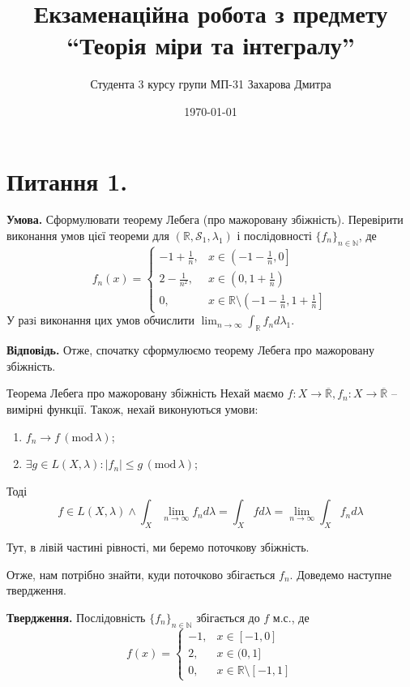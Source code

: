 \documentclass[14pt]{extarticle}
\title{Екзаменаційна робота з предмету ``Теорія міри та інтегралу''}
\author{Студента 3 курсу групи МП-31 Захарова Дмитра}
\date{\today}
\begin{document}
\maketitle

\section*{Питання 1.}

\textbf{Умова.} Сформулювати теорему Лебега (про мажоровану збіжність). Перевірити виконання умов цієї теореми для $(\mathbb{R},\mathcal{S}_1,\lambda_1)$ і послідовності $\{f_n\}_{n \in \mathbb{N}}$, де
\[
f_n(x) = \begin{cases}
    -1 + \frac{1}{n}, & x \in \left(-1-\frac{1}{n},0\right] \\
    2 - \frac{1}{n^2}, & x \in \left(0,1+\frac{1}{n}\right) \\
    0, & x \in \mathbb{R} \setminus \left(-1-\frac{1}{n},1+\frac{1}{n}\right]
\end{cases}
\]
У разi виконання цих умов обчислити $\lim_{n \to \infty}\int_{\mathbb{R}}f_nd\lambda_1$.

\textbf{Відповідь.} Отже, спочатку сформулюємо теорему Лебега про мажоровану збіжність.

\begin{theorem*}{Теорема Лебега про мажоровану збіжність}
Нехай маємо $f: X \to \overline{\mathbb{R}}, f_n: X \to \overline{\mathbb{R}}$ -- вимірні функції. Також, нехай виконуються умови:
\begin{enumerate}
    \item $f_n \to f \, (\text{mod} \, \lambda)$;
    \item $\exists g \in L(X,\lambda): |f_n| \leq g \, (\text{mod} \, \lambda)$;
\end{enumerate}
Тоді
\[
f \in L(X,\lambda) \wedge \int_X \lim_{n \to \infty}f_nd\lambda = \int_X fd\lambda = \lim_{n \to \infty}\int_X f_nd\lambda
\]

Тут, в лівій частині рівності, ми беремо поточкову збіжність.
\end{theorem*}

Отже, нам потрібно знайти, куди поточково збігається $f_n$. Доведемо наступне твердження. 

\textbf{Твердження.} Послідовність $\{f_n\}_{n \in \mathbb{N}}$ збігається до $f$ м.с., де
\[
f(x) = \begin{cases}
    -1, & x \in [-1,0] \\
    2, & x \in (0,1] \\
    0, & x \in \mathbb{R} \setminus [-1,1]
\end{cases}
\]
\end{document}
